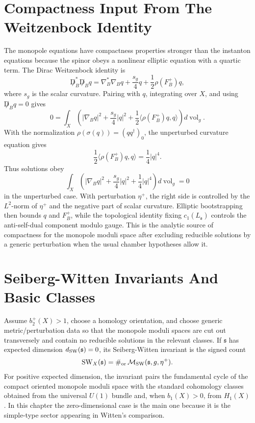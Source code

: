 \section{Compactness Input From The Weitzenbock Identity}

The monopole equations have compactness properties stronger than the
instanton equations because the spinor obeys a nonlinear elliptic equation
with a quartic term.  The Dirac Weitzenbock identity is
\[
  \not D_B^*\not D_B q
  =
  \nabla_B^*\nabla_B q
  +\frac{s_g}{4}q
  +\frac{1}{2}\rho(F_B^+)q ,
\]
where \(s_g\) is the scalar curvature.  Pairing with \(q\), integrating over
\(X\), and using \(\not D_Bq=0\) gives
\[
  0=
  \int_X\left(
    |\nabla_Bq|^2
    +\frac{s_g}{4}|q|^2
    +\frac{1}{2}\langle\rho(F_B^+)q,q\rangle
  \right)d\operatorname{vol}_g .
\]
With the normalization
\(\rho(\sigma(q))=(q q^\dagger)_0\), the unperturbed curvature equation gives
\[
  \frac{1}{2}\langle\rho(F_B^+)q,q\rangle
  =
  \frac{1}{4}|q|^4 .
\]
Thus solutions obey
\[
  \int_X\left(
    |\nabla_Bq|^2
    +\frac{s_g}{4}|q|^2
    +\frac{1}{4}|q|^4
  \right)d\operatorname{vol}_g
  =
  0
\]
in the unperturbed case.  With perturbation \(\eta^+\), the right side is
controlled by the \(L^2\)-norm of \(\eta^+\) and the negative part of scalar
curvature.  Elliptic bootstrapping then bounds \(q\) and \(F_B^+\), while the
topological identity fixing \(c_1(L_{\mathfrak s})\) controls the anti-self-dual
component modulo gauge.  This is the analytic source of compactness for the
monopole moduli space after excluding reducible solutions by a generic
perturbation when the usual chamber hypotheses allow it.

\section{Seiberg-Witten Invariants And Basic Classes}

Assume \(b_2^+(X)>1\), choose a homology orientation, and choose generic
metric/perturbation data so that the monopole moduli spaces are cut out
transversely and contain no reducible solutions in the relevant classes.  If
\(\mathfrak s\) has expected dimension \(d_{\rm SW}(\mathfrak s)=0\), its
Seiberg-Witten invariant is the signed count
\begin{equation}
  {\rm SW}_X(\mathfrak s)
  =
  \#_{\rm or}\,\mathcal M_{\rm SW}(\mathfrak s,g,\eta^+).
  \label{eq:sw-zero-dimensional-count}
\end{equation}
For positive expected dimension, the invariant pairs the fundamental cycle
of the compact oriented monopole moduli space with the standard cohomology
classes obtained from the universal \(U(1)\) bundle and, when \(b_1(X)>0\),
from \(H_1(X)\).  In this chapter the zero-dimensional case is the main one
because it is the simple-type sector appearing in Witten's comparison.

